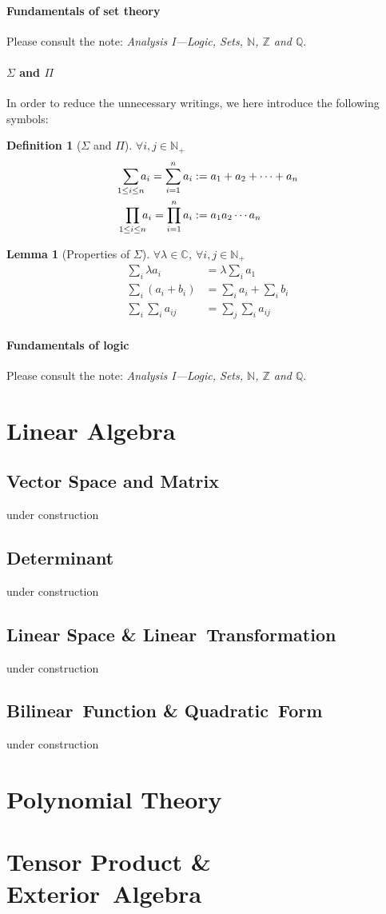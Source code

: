 \documentclass[a4paper]{book}
\newtheorem{definition}{Definition}[section]
\newtheorem{lemma}{Lemma}[section]
\begin{document}
				\subsection{Fundamentals of set theory}
					Please consult the note: \textit{Analysis I---Logic, Sets, $\mathbb{N}$, $\mathbb{Z}$ and $\mathbb{Q}$}.
				\subsection{$\Sigma$ and $\Pi$}
					In order to reduce the unnecessary writings, we here introduce the following symbols:
					\begin{definition}[$\Sigma$ and $\Pi$]
						$\forall i,j\in\mathbb{N}_+$
						\begin{align*}
							\sum_{1\leq i\leq n}\mspace{-9mu}a_i=\sum_{i=1}^{n}a_i&:=a_1+a_2+\dotsb +a_n\\
							\prod_{1\leq i\leq n}\mspace{-9mu}a_i=\prod_{i=1}^{n}a_i&:=a_1a_2\dotsm a_n
						\end{align*}
					\end{definition}
				\begin{lemma}[Properties of $\Sigma$]
					$\forall \lambda\in\mathbb{C}$, $\forall i,j\in\mathbb{N}_+$
					\begin{align*}
						\sum_{i}\lambda a_i&=\lambda\sum_{i}a_1\\
						\sum_{i}(a_i+b_i)&=\sum_{i}a_i+\sum_{i}b_i\\
						\sum_{i}\sum_{i}a_{ij}&=\sum_{j}\sum_{i}a_{ij}
					\end{align*}
				\end{lemma}
				\subsection{Fundamentals of logic}
					Please consult the note: \textit{Analysis I---Logic, Sets, $\mathbb{N}$, $\mathbb{Z}$ and $\mathbb{Q}$}.
\part{Linear Algebra}
	\chapter{Vector Space and Matrix}
	under construction
	\chapter{Determinant}
	under construction
	\chapter{Linear Space \& Linear~Transformation}
	under construction
	\chapter{Bilinear~Function \& Quadratic~Form}
	under construction
\part{Polynomial Theory}

\part{Tensor Product \& Exterior~Algebra}
\end{document}
